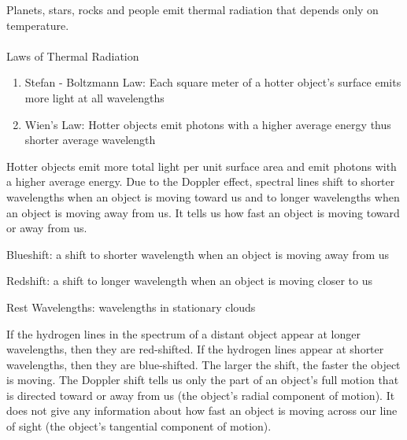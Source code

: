 \documentclass[12pt]{article}
\begin{document}
Planets, stars, rocks and people emit thermal radiation that depends only on temperature. \\~\\
Laws of Thermal Radiation \begin{enumerate} 
\item Stefan - Boltzmann Law: Each square meter of a hotter object's surface emits more light at all wavelengths 
\item Wien's Law: Hotter objects emit photons with a higher average energy thus shorter average wavelength \end{enumerate} 
Hotter objects emit more total light per unit surface area and emit photons with a higher average energy. 
Due to the Doppler effect, spectral lines shift to shorter wavelengths when an object is moving toward us and to longer wavelengths when an object is moving away from us. It tells us how fast an object is moving toward or away from us. 
\begin{definition} Blueshift: a shift to shorter wavelength when an object is moving away from us \end{definition}
\begin{definition} Redshift: a shift to longer wavelength when an object is moving closer to us \end{definition}
\begin{definition} Rest Wavelengths: wavelengths in stationary clouds \end{definition}
If the hydrogen lines in the spectrum of a distant object appear at longer wavelengths, then they are red-shifted. If the hydrogen lines appear at shorter wavelengths, then they are blue-shifted. The larger the shift, the faster the object is moving.
The Doppler shift tells us only the part of an object's full motion that is directed toward or away from us (the object's radial component of motion). It does not give any information about how fast an object is moving across our line of sight (the object's tangential component of motion). 
\end{document}
